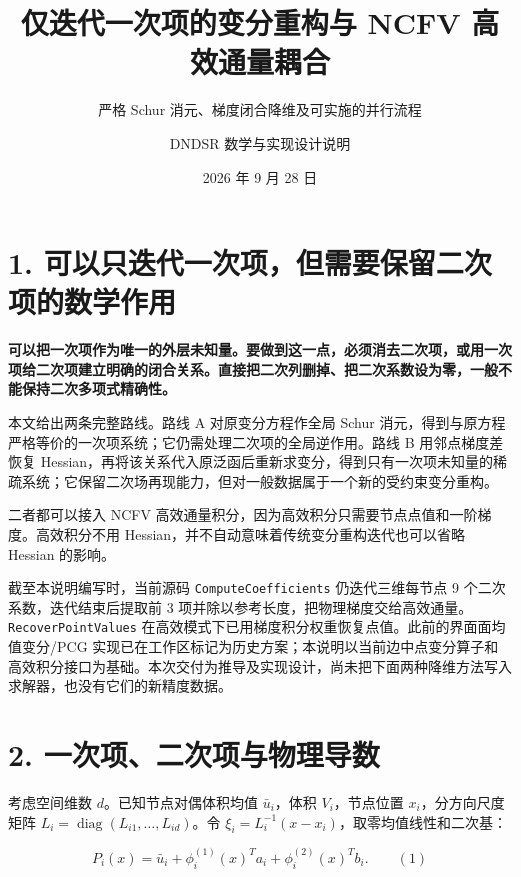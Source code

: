 \documentclass[
  11pt,
  a4paper,
]{article}
\title{仅迭代一次项的变分重构与 NCFV 高效通量耦合}
\subtitle{严格 Schur 消元、梯度闭合降维及可实施的并行流程}
\author{DNDSR 数学与实现设计说明}
\date{2026 年 9 月 28 日}
\begin{document}
\maketitle

\hypertarget{ux53efux4ee5ux53eaux8fedux4ee3ux4e00ux6b21ux9879ux4f46ux9700ux8981ux4fddux7559ux4e8cux6b21ux9879ux7684ux6570ux5b66ux4f5cux7528}{%
\section{1.
可以只迭代一次项，但需要保留二次项的数学作用}\label{ux53efux4ee5ux53eaux8fedux4ee3ux4e00ux6b21ux9879ux4f46ux9700ux8981ux4fddux7559ux4e8cux6b21ux9879ux7684ux6570ux5b66ux4f5cux7528}}

\textbf{可以把一次项作为唯一的外层未知量。要做到这一点，必须消去二次项，或用一次项给二次项建立明确的闭合关系。直接把二次列删掉、把二次系数设为零，一般不能保持二次多项式精确性。}

本文给出两条完整路线。路线 A 对原变分方程作全局 Schur
消元，得到与原方程严格等价的一次项系统；它仍需处理二次项的全局逆作用。路线
B 用邻点梯度差恢复
Hessian，再将该关系代入原泛函后重新求变分，得到只有一次项未知量的稀疏系统；它保留二次场再现能力，但对一般数据属于一个新的受约束变分重构。

二者都可以接入 NCFV
高效通量积分，因为高效积分只需要节点点值和一阶梯度。高效积分不用
Hessian，并不自动意味着传统变分重构迭代也可以省略 Hessian 的影响。

截至本说明编写时，当前源码 \texttt{ComputeCoefficients} 仍迭代三维每节点
9 个二次系数，迭代结束后提取前 3
项并除以参考长度，把物理梯度交给高效通量。\texttt{RecoverPointValues}
在高效模式下已用梯度积分权重恢复点值。此前的界面面均值变分/PCG
实现已在工作区标记为历史方案；本说明以当前边中点变分算子和高效积分接口为基础。本次交付为推导及实现设计，尚未把下面两种降维方法写入求解器，也没有它们的新精度数据。

\hypertarget{ux4e00ux6b21ux9879ux4e8cux6b21ux9879ux4e0eux7269ux7406ux5bfcux6570}{%
\section{2.
一次项、二次项与物理导数}\label{ux4e00ux6b21ux9879ux4e8cux6b21ux9879ux4e0eux7269ux7406ux5bfcux6570}}

考虑空间维数 \(d\)。已知节点对偶体积均值 \(\bar u_i\)，体积
\(V_i\)，节点位置 \(x_i\)，分方向尺度矩阵
\(L_i=\operatorname{diag}(L_{i1},\ldots,L_{id})\)。令
\(\xi_i=L_i^{-1}(x-x_i)\)，取零均值线性和二次基：

\[
P_i(x)=\bar u_i+\phi_i^{(1)}(x)^Ta_i+\phi_i^{(2)}(x)^Tb_i. \qquad(1)
\]
\end{document}
